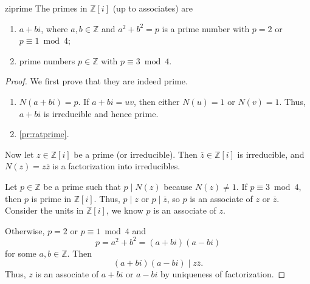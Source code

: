 \begin{theorem}{}{ziprime}
    The primes in \(\mathbb{Z}[i]\) (up to associates) are
    \begin{enumerate}
        \item \(a + bi\), where \(a, b \in \mathbb{Z}\) and \(a^2 + b^2 = p\) is a prime number with \(p = 2\) or \(p \equiv 1 \bmod 4\);
        \item prime numbers \(p \in \mathbb{Z}\) with \(p \equiv 3 \bmod 4\).
    \end{enumerate}
\end{theorem}
\begin{proof}
    We first prove that they are indeed prime.
    \begin{enumerate}
        \item \(N(a + bi) = p\). If \(a + bi = uv\), then either \(N(u) = 1\) or \(N(v) = 1\). Thus, \(a + bi\) is irreducible and hence prime.
        \item \cref{pr:ratprime}.
    \end{enumerate}
    Now let \(z \in \mathbb{Z}[i]\) be a prime (or irreducible). Then \(\overline{z} \in \mathbb{Z}[i]\) is irreducible, and \(N(z) = z \overline{z}\) is a factorization into irreducibles.

    Let \(p \in \mathbb{Z}\) be a prime such that \(p \mid N(z)\) because \(N(z) \neq 1\). If \(p \equiv 3 \bmod 4\), then \(p\) is prime in \(\mathbb{Z}[i]\). Thus, \(p \mid z\) or \(p \mid \overline{z}\), so \(p\) is an associate of \(z\) or \(\overline{z}\). Consider the units in \(\mathbb{Z}[i]\), we know \(p\) is an associate of \(z\).

    Otherwise, \(p = 2\) or \(p \equiv 1 \bmod 4\) and
    \[
        p = a^2 + b^2 = (a + bi)(a - bi)
    \]
    for some \(a, b \in \mathbb{Z}\). Then
    \[
        (a + bi)(a - bi) \mid z \overline{z}.
    \]
    Thus, \(z\) is an associate of \(a + bi\) or \(a - bi\) by uniqueness of factorization.
\end{proof}